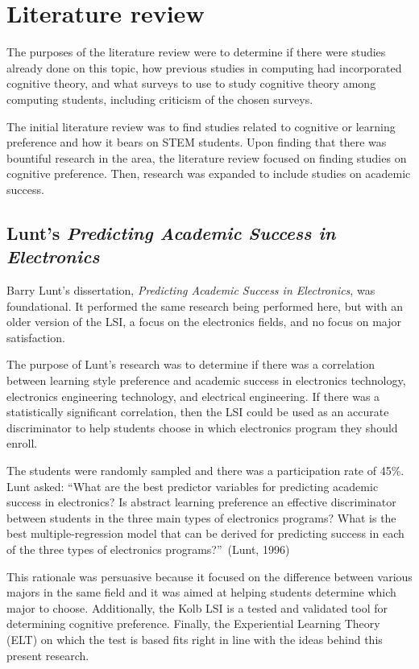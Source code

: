 \section{Literature review}
The purposes of the literature review were to determine if there were studies already done on this topic, how previous studies in computing had incorporated cognitive theory, and what surveys to use to study cognitive theory among computing students, including criticism of the chosen surveys.

The initial literature review was to find studies related to cognitive or learning preference and how it bears on STEM students. Upon finding that there was bountiful research in the area, the literature review focused on finding studies on cognitive preference. Then, research was expanded to include studies on academic success.

\subsection{Lunt's \textit{Predicting Academic Success in Electronics}}
Barry Lunt's dissertation, \textit{Predicting Academic Success in Electronics}, was foundational. It performed the same research being performed here, but with an older version of the LSI, a focus on the electronics fields, and no focus on major satisfaction.

The purpose of Lunt's research was to determine if there was a correlation between learning style preference and academic success in electronics technology, electronics engineering technology, and electrical engineering. If there was a statistically significant correlation, then the LSI could be used as an accurate discriminator to help students choose in which electronics program they should enroll.

The students were randomly sampled and there was a participation rate of 45\%. Lunt asked: ``What are the best predictor variables for predicting academic success in electronics? Is abstract learning preference an effective discriminator between students in the three main types of electronics programs? What is the best multiple-regression model that can be derived for predicting success in each of the three types of electronics programs?''~(Lunt, 1996)

This rationale was persuasive because it focused on the difference between various majors in the same field and it was aimed at helping students determine which major to choose. Additionally, the Kolb LSI is a tested and validated tool for determining cognitive preference. Finally, the Experiential Learning Theory (ELT) on which the test is based fits right in line with the ideas behind this present research.

